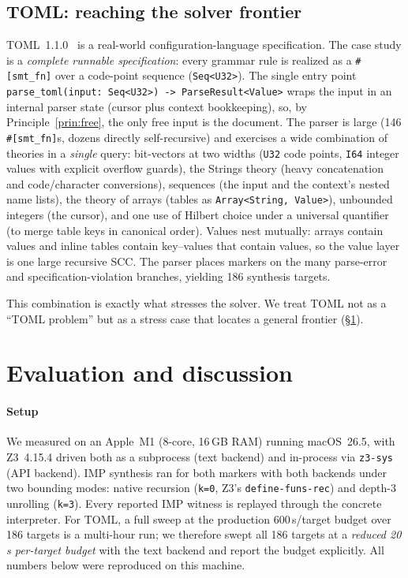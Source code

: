\documentclass[sigplan,review,anonymous]{acmart}
\theoremstyle{definition}
\theoremstyle{remark}
\newcommand{\imp}{IMP}
\newcommand{\toml}{TOML}
\newcommand{\code}[1]{\texttt{#1}}
\begin{document}
\subsection{\toml{}: reaching the solver frontier}
\label{sec:tomlcase}

\toml{}~1.1.0~\cite{tomlspec} is a real-world configuration-language
specification. The case study is a \emph{complete runnable specification}: every
grammar rule is realized as a \code{\#[smt\_fn]} over a code-point sequence
(\code{Seq<U32>}). The single entry point
\code{parse\_toml(input: Seq<U32>) -> ParseResult<Value>} wraps the input in an
internal parser state (cursor plus context bookkeeping), so, by
Principle~\ref{prin:free}, the only free input is the document. The parser is
large (146 \code{\#[smt\_fn]}s, dozens directly self-recursive) and exercises a
wide combination of theories in a \emph{single} query: bit-vectors at two widths
(\code{U32} code points, \code{I64} integer values with explicit overflow
guards), the Strings theory (heavy concatenation and code/character conversions),
sequences (the input and the context's nested name lists), the theory of arrays
(tables as \code{Array<String, Value>}), unbounded integers (the cursor), and one
use of Hilbert choice under a universal quantifier (to merge table keys in
canonical order). Values nest mutually: arrays contain values and inline tables
contain key--values that contain values, so the value layer is one large recursive
SCC. The parser places markers on the many parse-error and specification-violation
branches, yielding 186 synthesis targets.

This combination is exactly what stresses the solver. We treat \toml{} not as a
``\toml{} problem'' but as a stress case that locates a general frontier
(\S\ref{sec:eval}).

\section{Evaluation and discussion}
\label{sec:eval}

\paragraph{Setup}
We measured on an Apple~M1 (8-core, 16\,GB RAM) running macOS~26.5, with
Z3~4.15.4 driven both as a subprocess (text backend) and in-process via
\code{z3-sys} (API backend). \imp{} synthesis ran for both markers with both
backends under two bounding modes: native recursion (\code{k=0}, Z3's
\code{define-funs-rec}) and depth-3 unrolling (\code{k=3}). Every reported
\imp{} witness is replayed through the concrete interpreter. For \toml{}, a full
sweep at the production 600\,s/target budget over 186 targets is a multi-hour run;
we therefore swept all 186 targets at a \emph{reduced 20\,s per-target budget}
with the text backend and report the budget explicitly. All numbers below were
reproduced on this machine.
\end{document}
